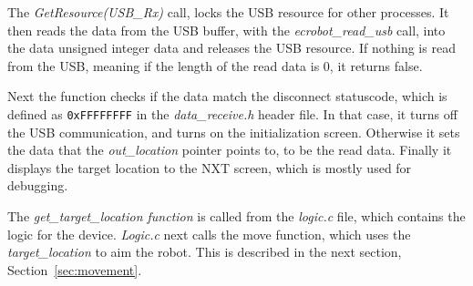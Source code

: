 The \textit{GetResource(USB\_Rx)} call, locks the USB resource for other processes.
It then reads the data from the USB buffer, with the \textit{ecrobot\_read\_usb} call, into the data unsigned integer data and releases the USB resource.
If nothing is read from the USB, meaning if the length of the read data is $0$, it returns false.

Next the function checks if the data match the disconnect statuscode, which is defined as \texttt{0xFFFFFFFF} in the \textit{data\_receive.h} header file.
In that case, it turns off the USB communication, and turns on the initialization screen.
Otherwise it sets the data that the \textit{out\_location} pointer points to, to be the read data.
Finally it displays the target location to the NXT screen, which is mostly used for debugging.

The \textit{get\_target\_location function} is called from the \textit{logic.c} file, which contains the logic for the device.
\textit{Logic.c} next calls the move function, which uses the \textit{target\_location} to aim the robot.
This is described in the next section, Section~\ref{sec:movement}.
